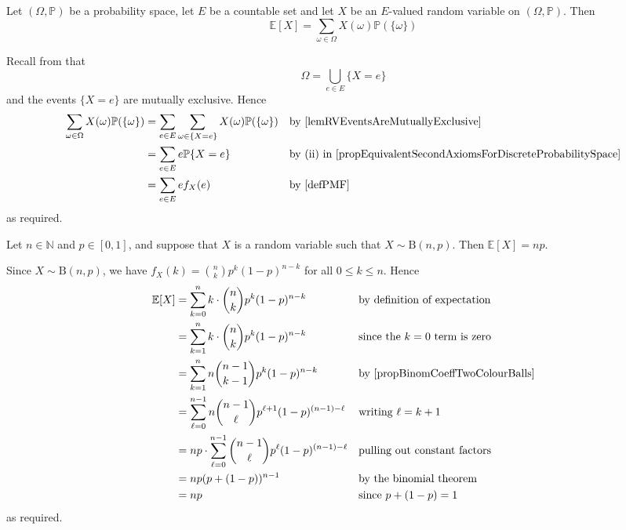 \begin{lemma}
\label{lemAlternativeDefinitionExpectation}
Let $(\Omega,\mathbb{P})$ be a probability space, let $E$ be a countable set and let $X$ be an $E$-valued random variable on $(\Omega,\mathbb{P})$. Then
\[ \mathbb{E}[X] = \sum_{\omega \in \Omega} X(\omega)\mathbb{P}(\{\omega\}) \]
\end{lemma}
\begin{cproof}
Recall from  that
\[ \Omega = \bigcup_{e \in E} \{ X=e \} \]
and the events $\{ X=e \}$ are mutually exclusive. Hence
\begin{align*}
\sum_{\omega \in \Omega} X(\omega)\mathbb{P}(\{\omega\})
&= \sum_{e \in E} \sum_{\omega \in \{ X=e \}} X(\omega)\mathbb{P}(\{\omega\}) && \text{by \Cref{lemRVEventsAreMutuallyExclusive}} \\
&= \sum_{e \in E} e \mathbb{P}\{X=e\} && \text{by (ii) in \Cref{propEquivalentSecondAxiomsForDiscreteProbabilitySpace}} \\
&= \sum_{e \in E} e f_X(e) && \text{by \Cref{defPMF}}
\end{align*}
as required.
\end{cproof}

\begin{proposition}
\label{propExpectationOfBinomial}
Let $n \in \mathbb{N}$ and $p \in [0,1]$, and suppose that $X$ is a random variable such that $X \sim \mathrm{B}(n,p)$. Then $\mathbb{E}[X] = np$.
\end{proposition}

\begin{cproof}
Since $X \sim \mathrm{B}(n,p)$, we have $f_X(k) = \binom{n}{k}p^k(1-p)^{n-k}$ for all $0 \le k \le n$. Hence
\begin{align*}
\mathbb{E}[X] &= \sum_{k=0}^n k \cdot \binom{n}{k} p^k(1-p)^{n-k} && \text{by definition of expectation} \\
&= \sum_{k=1}^n k \cdot \binom{n}{k} p^k(1-p)^{n-k} && \text{since the $k=0$ term is zero} \\
&= \sum_{k=1}^n n \binom{n-1}{k-1} p^k(1-p)^{n-k} && \text{by \Cref{propBinomCoeffTwoColourBalls}} \\
&= \sum_{\ell=0}^{n-1} n \binom{n-1}{\ell} p^{\ell+1}(1-p)^{(n-1)-\ell} && \text{writing $\ell=k+1$} \\
&= np \cdot \sum_{\ell=0}^{n-1} \binom{n-1}{\ell} p^{\ell}(1-p)^{(n-1)-\ell} && \text{pulling out constant factors} \\
&= np(p+(1-p))^{n-1} && \text{by the binomial theorem} \\
&= np && \text{since $p+(1-p)=1$}
\end{align*}
as required.
\end{cproof}

